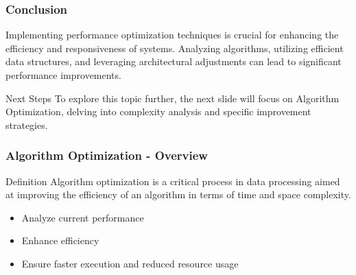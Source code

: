 \documentclass[aspectratio=169]{beamer}
\begin{document}
\begin{frame}[fragile]
    \frametitle{Conclusion}
    Implementing performance optimization techniques is crucial for enhancing the efficiency and responsiveness of systems. Analyzing algorithms, utilizing efficient data structures, and leveraging architectural adjustments can lead to significant performance improvements.
    
    \begin{block}{Next Steps}
        To explore this topic further, the next slide will focus on Algorithm Optimization, delving into complexity analysis and specific improvement strategies.
    \end{block}
\end{frame}

\begin{frame}[fragile]
    \frametitle{Algorithm Optimization - Overview}
    \begin{block}{Definition}
        Algorithm optimization is a critical process in data processing aimed at improving the efficiency of an algorithm in terms of time and space complexity. 
    \end{block}
    \begin{itemize}
        \item Analyze current performance
        \item Enhance efficiency
        \item Ensure faster execution and reduced resource usage
    \end{itemize}
\end{frame}
\end{document}
